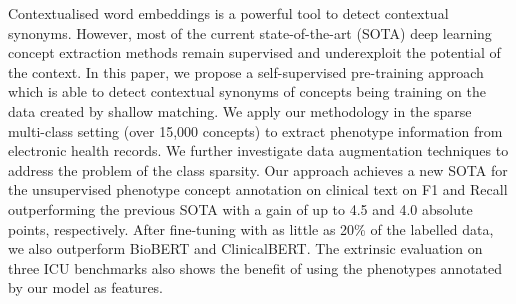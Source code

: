 Contextualised word embeddings is a powerful tool to detect contextual synonyms. However, most of the current state-of-the-art (SOTA) deep learning concept extraction methods remain supervised and underexploit the potential of the context. In this paper, we propose a self-supervised pre-training approach which is able to detect contextual synonyms of concepts being training on the data created by shallow matching. We apply our methodology in the sparse multi-class setting (over 15,000 concepts) to extract phenotype information from electronic health records. We further investigate data augmentation techniques to address the problem of the class sparsity. Our approach achieves a new SOTA for the unsupervised phenotype concept annotation on clinical text on F1 and Recall outperforming the previous SOTA with a gain of up to 4.5 and 4.0 absolute points, respectively. After fine-tuning with as little as 20\% of the labelled data, we also outperform BioBERT and ClinicalBERT. The extrinsic evaluation on three ICU benchmarks also shows the benefit of using the phenotypes annotated by our model as features.
